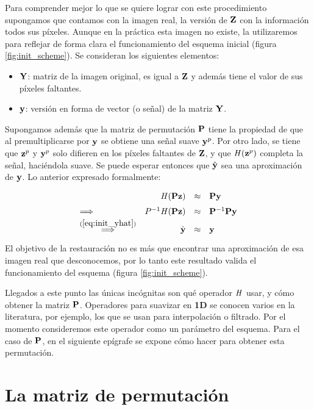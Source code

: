 Para comprender mejor lo que se quiere lograr con este procedimiento supongamos que contamos con la imagen real, la versi\'on de $\Z$ con la informaci\'on todos sus p\'ixeles. Aunque en la pr\'actica esta imagen no existe, la utilizaremos para reflejar de forma clara el funcionamiento del esquema inicial (figura \ref{fig:init_scheme}). Se consideran los siguientes elementos:
\begin{itemize}
	\item $\Y$: matriz de la imagen original, es igual a $\Z$ y adem\'as tiene el valor de sus p\'ixeles faltantes. 
	\item $\y$: versión en forma de vector (o señal) de la matriz $\Y$.
\end{itemize}
Supongamos adem\'as que la matriz de permutaci\'on $\P$ tiene la propiedad de que al premultiplicarse por $\y$ se obtiene una señal suave $\y^p$. Por otro lado, se tiene que $\z^p$ y $\y^p$ solo difieren en los p\'ixeles faltantes de $\Z$, y que $\H(\z^p)$ completa la señal, haciéndola suave. Se puede esperar entonces que $\yhat$ sea una aproximaci\'on de $\y$. Lo anterior expresado formalmente:
\begin{equation}
	\def\arraystretch{1.5}
	\begin{array}{lrcl}
		                                           &     \H (\P\z ) &\approx& \P\y        \\ 
		\Longrightarrow                            & P^{-1}\H(\P\z) &\approx& \P^{-1}\P\y \\
		\overset{(\ref{eq:init_yhat})}{\Longrightarrow} &          \yhat &\approx& \y          \\
	\end{array}
	\label{eq:permutation_smoothness}
\end{equation}
El objetivo de la restauraci\'on no es m\'as que encontrar una aproximaci\'on de esa imagen real que desconocemos, por lo tanto este resultado valida el funcionamiento del esquema (figura \ref{fig:init_scheme}).

Llegados a este punto las únicas incógnitas son qu\'e operador $\H$ usar, y c\'omo obtener la matriz $\P$. Operadores para suavizar en \textbf{1D} se conocen varios en la literatura, por ejemplo, los que se usan para interpolaci\'on o filtrado. Por el momento consideremos este operador como un par\'ametro del esquema. Para el caso de $\P$, en el siguiente ep\'igrafe se expone c\'omo hacer para obtener esta permutaci\'on.

\section{La matriz de permutaci\'on}

